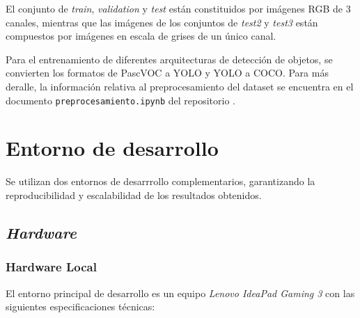 \documentclass[12pt,a4paper,onecolumn,oneside]{report}
\begin{document}
El conjunto de \textit{train}, \textit{validation} y \textit{test} están constituidos por imágenes RGB de 3 canales, mientras que las imágenes 
de los conjuntos de \textit{test2} y \textit{test3} están compuestos por imágenes en escala de grises de un único canal. 

Para el entrenamiento de diferentes arquitecturas de detección de objetos, se convierten los formatos de PascVOC a YOLO y YOLO a COCO. 
Para más deralle, la información relativa al preprocesamiento del dataset se encuentra en el documento \texttt{preprocesamiento.ipynb} del repositorio \cite{repoTFM}.

\section{Entorno de desarrollo}
\label{sec:Entorno de desarrollo}
Se utilizan dos entornos de desarrrollo complementarios, garantizando la reproducibilidad y escalabilidad de los resultados obtenidos.

\subsection{\textit{Hardware}}
\subsubsection{Hardware Local}
El entorno principal de desarrollo es un equipo \textit{Lenovo IdeaPad Gaming 3} con las siguientes especificaciones técnicas:
\end{document}
